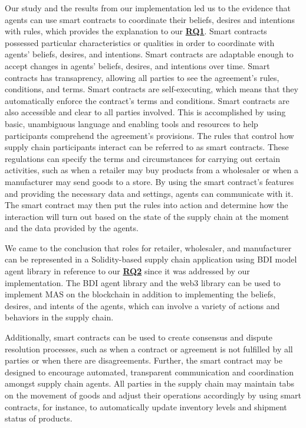 Our study and the results from our implementation led us to the evidence that agents can use smart contracts to coordinate their beliefs, desires and intentions with rules, which provides the explanation to our \hyperref[RQ1.]{\textbf{RQ1}}. Smart contracts possessed particular characteristics or qualities in order to coordinate with agents' beliefs, desires, and intentions. Smart contracts are adaptable enough to accept changes in agents' beliefs, desires, and intentions over time. Smart contracts has transaprency, allowing all parties to see the agreement's rules, conditions, and terms. Smart contracts are self-executing, which means that they automatically enforce the contract's terms and conditions. Smart contracts are also accessible and clear to all parties involved. This is accomplished by using basic, unambiguous language and enabling tools and resources to help participants comprehend the agreement's provisions. The rules that control how supply chain participants interact can be referred to as smart contracts. These regulations can specify the terms and circumstances for carrying out certain activities, such as when a retailer may buy products from a wholesaler or when a manufacturer may send goods to a store. By using the smart contract's features and providing the necessary data and settings, agents can communicate with it. The smart contract may then put the rules into action and determine how the interaction will turn out based on the state of the supply chain at the moment and the data provided by the agents.

\vspace{.5cm}

We came to the conclusion that roles for retailer, wholesaler, and manufacturer can be represented in a Solidity-based supply chain application using \ac{BDI} model agent library in reference to our \hyperref[RQ2.]{\textbf{RQ2}} since it was addressed by our implementation. The \ac{BDI} agent library and the web3 library can be used to implement \ac{MAS} on the blockchain in addition to implementing the beliefs, desires, and intents of the agents, which can involve a variety of actions and behaviors in the supply chain.

\vspace{.5cm}

Additionally, smart contracts can be used to create consensus and dispute resolution processes, such as when a contract or agreement is not fulfilled by all parties or when there are disagreements. Further, the smart contract may be designed to encourage automated, transparent communication and coordination amongst supply chain agents. All parties in the supply chain may maintain tabs on the movement of goods and adjust their operations accordingly by using smart contracts, for instance, to automatically update inventory levels and shipment status of products.

